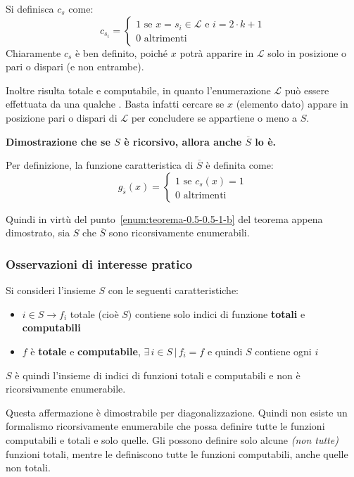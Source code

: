 \documentclass[italian, 10pt]{article}
\begin{document}
Si definisca \(c_s\) come:
\[
  c_{s_i} = \begin{cases}
    1 \text{ se } x = s_i \in \mathscr{L} \text{ e } i = 2\cdot k + 1 \\
    0 \text{ altrimenti }
  \end{cases}
\]
Chiaramente \(c_s\) è ben definito, poiché \(x\) potrà apparire in \(\mathscr{L}\) solo in posizione o pari o dispari (e non entrambe).

Inoltre risulta totale e computabile, in quanto l'enumerazione \(\mathscr{L}\) può essere effettuata da una qualche \TM.
Basta infatti cercare se \(x\) (elemento dato) appare in posizione pari o dispari di \(\mathscr{L}\) per concludere se appartiene o meno a \(S\).

\bigskip
\textbf{Dimostrazione che se \(S\) è ricorsivo, allora anche \(\overline{S}\) lo è.}

Per definizione, la funzione caratteristica di \(\overline{S}\) è definita come:
\[  g_{\overline{s}}(x) = \begin{cases}
    1 \text{ se } c_s(x) = 1 \\
    0 \text{ altrimenti }
  \end{cases}  \]

Quindi in virtù del punto~\ref{enum:teorema-0.5-0.5-1-b} del teorema appena dimostrato, sia \(S\) che \(\overline{S}\) sono ricorsivamente enumerabili.

\subsubsection{Osservazioni di interesse pratico}

Si consideri l'insieme \(S\) con le seguenti caratteristiche:

\begin{itemize}
  \item \(i \in S \rightarrow f_i\) totale (cioè \(S\)) contiene solo indici di funzione \textbf{totali} e \textbf{computabili}
  \item \(f\) è \textbf{totale} e \textbf{computabile}, \(\exists \, i \in S \, | \, f_i = f\) e quindi \(S\) contiene ogni \(i\)
\end{itemize}

\(S\) è quindi l'insieme di indici di funzioni totali e computabili e non è ricorsivamente enumerabile.

Questa affermazione è dimostrabile per diagonalizzazione.
Quindi non esiste un formalismo ricorsivamente enumerabile che possa definire tutte le funzioni computabili e totali e solo quelle.
Gli \FSA possono definire solo alcune \textit{(non tutte)} funzioni totali, mentre le \TM definiscono tutte le funzioni computabili, anche quelle non totali.
\end{document}
